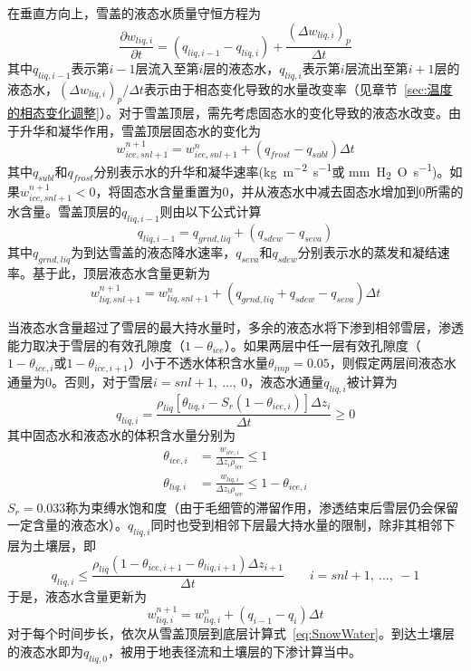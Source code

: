 在垂直方向上，雪盖的液态水质量守恒方程为
\begin{equation}
    \frac{\partial w_{liq,i}}{\partial t}=\left(q_{liq,i-1}-q_{liq,i}\right)+\frac{{\left(\Delta w_{liq,i}\right)}_p}{\Delta t}
\end{equation}
其中$q_{liq,i-1}$表示第$i-1$层流入至第$i$层的液态水，$q_{liq,i}$表示第$i$层流出至第$i+1$层的液态水，${{\left(\Delta w_{liq,i}\right)}_p}/{\Delta t}$表示由于相态变化导致的水量改变率（见章节~\ref{sec:温度的相态变化调整}）。对于雪盖顶层，需先考虑固态水的变化导致的液态水改变。由于升华和凝华作用，雪盖顶层固态水的变化为
\begin{equation}
    w_{ice,snl+1}^{n+1}=w_{ice,snl+1}^n+\left(q_{frost}-q_{subl}\right)\Delta t
\end{equation}
其中$q_{subl}$和$q_{frost}$分别表示水的升华和凝华速率(\unit{kg.m^{-2}.s^{-1}}或 \unit{mm.H_2O.s^{-1}})。如果$w_{ice,snl+1}^{n+1}<0$，将固态水含量重置为0，并从液态水中减去固态水增加到0所需的水含量。雪盖顶层的$q_{liq,i-1}$则由以下公式计算
\begin{equation}
    q_{liq,i-1}=q_{grnd,liq}+\left(q_{sdew}-q_{seva}\right)
\end{equation}
其中$q_{grnd,liq}$为到达雪盖的液态降水速率，$q_{seva}$和$q_{sdew}$分别表示水的蒸发和凝结速率。基于此，顶层液态水含量更新为
\begin{equation}w_{liq,snl+1}^{n+1}=w_{liq,snl+1}^n+\left(q_{grnd,liq}+q_{sdew}-q_{seva}\right)\Delta t
\end{equation}

当液态水含量超过了雪层的最大持水量时，多余的液态水将下渗到相邻雪层，渗透能力取决于雪层的有效孔隙度（$1-\theta_{ice}$）。如果两层中任一层有效孔隙度（$1-\theta_{ice,i}$或$1-\theta_{ice,i+1}$）小于不透水体积含水量$\theta_{imp}=0.05$，则假定两层间液态水通量为0。否则，对于雪层$i=snl+1,\ ...,\ 0$，液态水通量$q_{liq,i}$被计算为
\begin{equation}
    q_{liq,i}=\frac{\rho_{liq}\left[\theta_{liq,i}-S_r\left(1-\theta_{ice,i}\right)\right]\Delta z_i}{\Delta t}\geqslant 0
\end{equation}
其中固态水和液态水的体积含水量分别为
\begin{align}
    \theta_{ice,i}&=\frac{w_{ice,i}}{\Delta z_i \rho_{ice}} \leqslant 1 \\
    \theta_{liq,i}&=\frac{w_{liq,i}}{\Delta z_i \rho_{ice}} \leqslant 1-\theta_{ice,i}
\end{align}
$S_r=0.033$称为束缚水饱和度（由于毛细管的滞留作用，渗透结束后雪层仍会保留一定含量的液态水）。$q_{liq,i}$同时也受到相邻下层最大持水量的限制，除非其相邻下层为土壤层，即
\begin{equation}
    q_{liq,i} \leqslant \frac{\rho_{liq}\left(1-\theta_{ice,i+1}-\theta_{liq,i+1}\right)\Delta z_{i+1}}{\Delta t} \qquad i=snl+1,\ ...,\ -1
\end{equation}
于是，液态水含量更新为
\begin{equation}\label{eq:SnowWater}
    w_{liq,i}^{n+1}=w_{liq,i}^n+\left(q_{i-1}-q_i\right)\Delta t
\end{equation}
对于每个时间步长，依次从雪盖顶层到底层计算式~\eqref{eq:SnowWater}。到达土壤层的液态水即为$q_{liq,0}$，被用于地表径流和土壤层的下渗计算当中。

